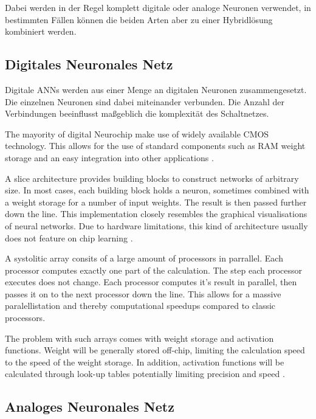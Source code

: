 \documentclass[conference]{IEEEtran}
\begin{document}
    Dabei werden in der Regel komplett digitale oder analoge Neuronen verwendet, in bestimmten Fällen können die beiden Arten aber zu einer Hybridlösung kombiniert werden.


    \subsection{Digitales Neuronales Netz}

    Digitale ANNs werden aus einer Menge an digitalen Neuronen zusammengesetzt.
    Die einzelnen Neuronen sind dabei miteinander verbunden.
    Die Anzahl der Verbindungen beeinflusst maßgeblich die komplexität des Schaltnetzes.

    The mayority of digital Neurochip make use of widely available CMOS technology.
    This allows for the use of standard components such as RAM weight storage and an easy integration into other applications \cite{dias2004artificial}.

    A slice architecture provides building blocks to construct networks of arbitrary size.
    In most cases, each building block holds a neuron, sometimes combined with a weight storage for a number of input weights.
    The result is then passed further down the line.
    This implementation closely resembles the graphical visualisations of neural networks.
    Due to hardware limitations, this kind of architecture usually does not feature on chip learning \cite{dias2004artificial}.

    A systolitic array consits of a large amount of processors in parrallel.
    Each processor computes exactly one part of the calculation.
    The step each processor executes does not change.
    Each processor computes it's result in parallel, then passes it on to the next processor down the line.
    This allows for a massive paralellistation and thereby computational speedups compared to classic processors.

    The problem with such arrays comes with weight storage and activation functions.
    Weight will be generally stored off-chip, limiting the calculation speed to the speed of the weight storage.
    In addition, activation functions will be calculated through look-up tables potentially limiting precision and speed \cite{dias2004artificial}.

    \subsection{Analoges Neuronales Netz}
\end{document}
